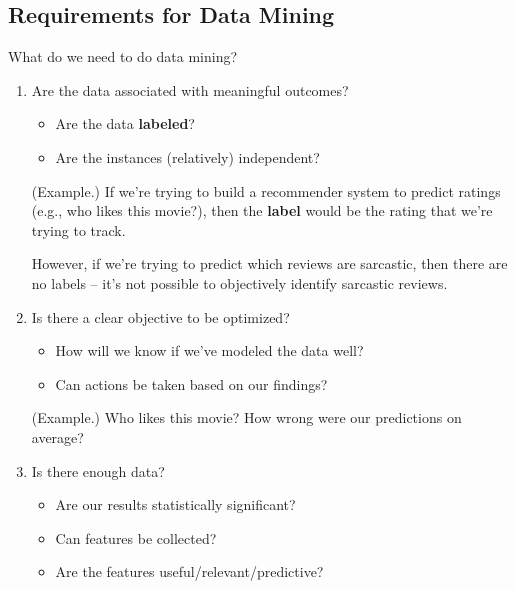 \documentclass[letterpaper]{article}
\begin{document}
\subsection{Requirements for Data Mining}
What do we need to do data mining? 
\begin{enumerate}
    \item Are the data associated with meaningful outcomes? 
    \begin{itemize}
        \item Are the data \textbf{labeled}?
        \item Are the instances (relatively) independent? 
    \end{itemize}

    \begin{mdframed}[]
        (Example.) If we're trying to build a recommender system to predict ratings (e.g., who likes this movie?), then the \textbf{label} would be the rating that we're trying to track.
        
        \bigskip 

        However, if we're trying to predict which reviews are sarcastic, then there are no labels -- it's not possible to objectively identify sarcastic reviews.
    \end{mdframed}

    \item Is there a clear objective to be optimized? 
    \begin{itemize}
        \item How will we know if we've modeled the data well? 
        \item Can actions be taken based on our findings? 
    \end{itemize}

    \begin{mdframed}[]
        (Example.) Who likes this movie? How wrong were our predictions on average? 
    \end{mdframed}

    \item Is there enough data? 
    \begin{itemize}
        \item Are our results statistically significant? 
        \item Can features be collected?
        \item Are the features useful/relevant/predictive?
    \end{itemize}
\end{enumerate}
\end{document}
